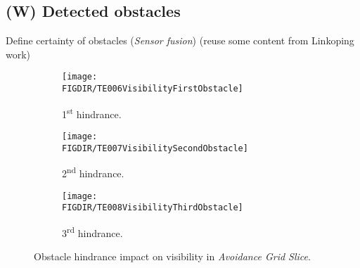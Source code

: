 \subsection{(W) Detected obstacles}\label{s:detectedObstacles}
    \noindent Define certainty of obstacles (\emph{Sensor fusion}) (reuse some content from Linkoping work)



\begin{figure}[H]
    \centering
    \begin{subfigure}{0.32\textwidth}
        \texttt{[image: \\FIGDIR/TE006VisibilityFirstObstacle]} 
        \caption{1\textsuperscript{st} hindrance.}
        \label{fig:fistObstacleHindrance}
    \end{subfigure}
    \begin{subfigure}{0.32\textwidth}
        \texttt{[image: \\FIGDIR/TE007VisibilitySecondObstacle]} 
        \caption{2\textsuperscript{nd} hindrance.}
        \label{fig:secondObstacleHindrance}
    \end{subfigure}
    \begin{subfigure}{0.32\textwidth}
        \texttt{[image: \\FIGDIR/TE008VisibilityThirdObstacle]} 
        \caption{3\textsuperscript{rd} hindrance.}
        \label{fig:thirdObstacleHindrance}
    \end{subfigure}
    \caption{Obstacle hindrance impact on visibility in \emph{Avoidance Grid Slice}.}
    \label{fig:hindranceImpactOnVisibility}
\end{figure}
